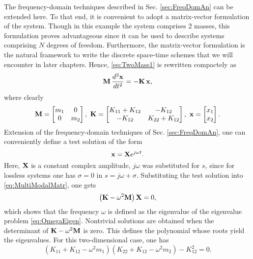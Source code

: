 \documentclass[11pt,twoside,a4paper,english]{book}
\begin{document}
The frequency-domain techniques described in Sec. \ref{sec:FreqDomAn} can be extended here. To that end, it is convenient to adopt a matrix-vector formulation of the system. Though in this example the system comprises $2$ masses, this formulation proves advantageous since it can be used to describe systems comprising $N$ degrees of freedom. Furthermore, the matrix-vector formulation is the natural framework to write the discrete space-time schemes that we will encounter in later chapters. Hence, \eqref{eq:TwoMass1} is rewritten compactely as
\begin{equation}\label{eq:MultiModalMatr}
{\bf M} \, \frac{d^2{\bf x}}{dt^2} = -{\bf K} \, {\bf x}, 
\end{equation}
where clearly
\begin{equation}
{\bf M} = \begin{bmatrix}m_1 & 0 \\ 0 & m_2 \end{bmatrix}, \,\, {\bf K} = \begin{bmatrix}K_{11}+K_{12} & -K_{12} \\ -K_{12} & K_{22}+K_{12} \end{bmatrix}, \,\, {\bf x} = \begin{bmatrix}x_1  \\  x_2 \end{bmatrix}.
\end{equation}
Extension of the frequency-domain techniques of Sec. \ref{sec:FreqDomAn}, one can conveniently define a test solution of the form
\begin{equation}
{\bf x} =  {\bf X} e^{j\omega t}.
\end{equation}
Here, $ {\bf X}$ is a constant complex amplitude, $j\omega$ was substituted for $s$, since for lossless systems one has $\sigma = 0$ in $s = j\omega + \sigma$. Substituting the test solution into \eqref{eq:MultiModalMatr}, one gets
\begin{equation}\label{eq:OmegaEigen}
\left( {\bf K } - \omega^2 {\bf M} \right)  {\bf X} = 0,
\end{equation}
which shows that the frequency $\omega$ is defined as the eigenvalue of the  eigenvalue problem \eqref{eq:OmegaEigen}. Nontrivial solutions are obtained when the determinant of ${\bf K } - \omega^2 {\bf M}$ is zero. This defines the polynomial whose roots yield the eigenvalues. For this two-dimensional case, one has
\begin{equation}
 (K_{11}+K_{12} - \omega^2 m_1)(K_{22}+K_{12} - \omega^2 m_2) - K_{12}^2 = 0.
\end{equation}
\end{document}
